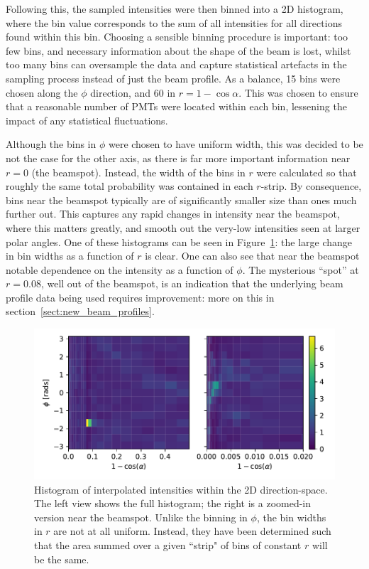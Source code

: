 Following this, the sampled intensities were then binned into a 2D histogram, where the bin value corresponds to the sum of all intensities for all directions found within this bin. Choosing a sensible binning procedure is important: too few bins, and necessary information about the shape of the beam is lost, whilst too many bins can oversample the data and capture statistical artefacts in the sampling process instead of just the beam profile. As a balance, 15 bins were chosen along the $\phi$ direction, and 60 in $r=1-\cos\alpha$. This was chosen to ensure that a reasonable number of PMTs were located within each bin, lessening the impact of any statistical fluctuations.

Although the bins in $\phi$ were chosen to have uniform width, this was decided to be not the case for the other axis, as there is far more important information near $r = 0$ (the beamspot). Instead, the width of the bins in $r$ were calculated so that roughly the same total probability was contained in each $r$-strip. By consequence, bins near the beamspot typically are of significantly smaller size than ones much further out. This captures any rapid changes in intensity near the beamspot, where this matters greatly, and smooth out the very-low intensities seen at larger polar angles. One of these histograms can be seen in Figure~\ref{fig:hist_cdf_old_profile}: the large change in bin widths as a function of $r$ is clear. One can also see that near the beamspot notable dependence on the intensity as a function of $\phi$. The mysterious ``spot'' at $r = 0.08$, well out of the beamspot, is an indication that the underlying beam profile data being used requires improvement: more on this in section~\ref{sect:new_beam_profiles}.

\begin{figure}
    \centering
    \includegraphics[width=\linewidth]{4_SMELLIESimulation/images/FS055_60_alpha_15_phi_hist.pdf}
    \caption[Histogram of interpolated intensities within the 2D direction-space]{Histogram of interpolated intensities within the 2D direction-space. The left view shows the full histogram; the right is a zoomed-in version near the beamspot. Unlike the binning in $\phi$, the bin widths in $r$ are not at all uniform. Instead, they have been determined such that the area summed over a given ``strip" of bins of constant $r$ will be the same.}
    \label{fig:hist_cdf_old_profile}
\end{figure}

